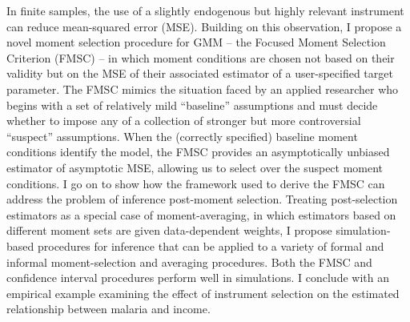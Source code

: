 In finite samples, the use of a slightly endogenous but highly relevant instrument can reduce mean-squared error (MSE). 
Building on this observation, I propose a novel moment selection procedure for GMM -- the Focused Moment Selection Criterion (FMSC) -- in which moment conditions are chosen not based on their validity but on the MSE of their associated estimator of a user-specified target parameter.
The FMSC mimics the situation faced by an applied researcher who begins with a set of relatively mild ``baseline'' assumptions and must decide whether to impose any of a collection of stronger but more controversial ``suspect'' assumptions.
When the (correctly specified) baseline moment conditions identify the model, the FMSC provides an asymptotically unbiased estimator of asymptotic MSE, allowing us to select over the suspect moment conditions.
I go on to show how the framework used to derive the FMSC can address the problem of inference post-moment selection.
Treating post-selection estimators as a special case of moment-averaging, in which estimators based on different moment sets are given data-dependent weights, I propose  simulation-based procedures for inference that can be applied to a variety of formal and informal moment-selection and averaging procedures.
Both the FMSC and confidence interval procedures perform well in simulations.
I conclude with an empirical example examining the effect of instrument selection on the estimated relationship between malaria and income.
